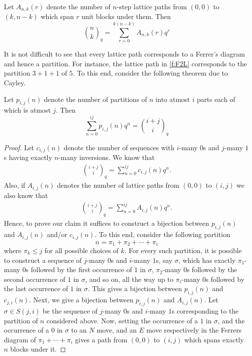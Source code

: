 \begin{theorem}
Let $A_{n,k}(r)$ denote the number of $n$-step lattice paths from $(0,0)$ to $(k,n-k)$ which span $r$ unit blocks under them. Then 
\[
\binom{n}{k}_q = \sum_{r=0}^{k(n-k)}A_{n,k}(r)q^r
\]
\end{theorem}
It is not difficult to see that every lattice path corresponds to a Ferrer's diagram and hence a partition. For instance, the lattice path in \cref{f:F2L} corresponds to the partition $3+1+1$ of $5$. To this end, consider the following theorem due to Cayley.
\begin{theorem}
Let $p_{i,j}\left( n \right)$ denote the number of partitions of $n$ into atmost $i$ parts each of which is atmost $j$. Then \[
	\sum_{n=0}^{ij}p_{i,j}\left( n \right) q^n = \binom{i+j}{i}_q 
\]     
\end{theorem}
\begin{proof}
Let $c_{i,j}\left( n \right)$ denote the number of sequences with $i$-many $0$s and $j$-many $1$s having exactly $n$-many inversions. We know that
\begin{align*}
	\binom{i+j}{i}_q = \sum_{n=0}^{ij}c_{i,j}\left( n \right)q^n.
\end{align*}
Also, if $A_{i,j}\left( n \right)$ denotes the number of lattice paths from $\left( 0,0 \right)$ to $\left( i,j \right)$ we also know that
\begin{align*}
	\binom{i+j}{i}_{q} = \sum_{n=0}^{ij}A_{i,j}\left( n \right)q^n.
\end{align*}
Hence, to prove our claim it suffices to construct a bijection between $p_{i,j}\left( n \right)$ and $A_{i,j}\left( n \right)$ and/or $c_{i,j}\left( n \right)$. To this end, consider the following partition \[
	n = \pi_{1}+\pi_{2}+\cdots+\pi_{i}
\]
where $\pi_{k}\leq j$ for all possible choices of $k$. For every such partition, it is possible to construct a sequence of $j$-many $0$s and $i$-many $1$s, say $\sigma$, which has exactly $\pi_{1}$-many $0$s followed by the first occurrence of $1$ in $\sigma$, $\pi_{2}$-many $0$s followed by the second occurrence of $1$ in $\sigma$, and so on, all the way up to $\pi_{i}$-many $0$s followed by the last occurrence of $1$ in $\sigma$. This gives a bijection between $p_{i,j}\left( n \right)$ and $c_{j,i}\left( n \right)$. Next, we give a bijection between $p_{i,j}\left( n \right)$ and $A_{i,j}\left( n \right)$. Let $\sigma \in S\left(j,i\right)$ be the sequence of $j$-many $0$s and  $i$-many $1$s corresponding to the partition of $n$ considered above. Now, setting the occurrence of a $1$ in $\sigma$, and the occurrence of a $0$ in $\sigma$ to an $N$ move, and an $E$ move respectively in the Ferrers diagram of $\pi_{1}+\cdots+\pi_{i}$ gives a path from $\left( 0,0 \right)$ to $\left( i,j \right)$ which spans exactly $n$ blocks under it.
\end{proof}
